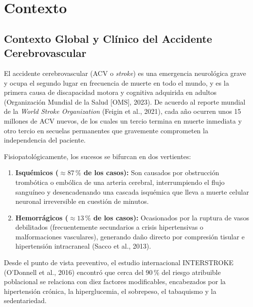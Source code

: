 \documentclass[12pt,a4paper]{article}
\begin{document}
\section{Contexto}

\subsection{Contexto Global y Clínico del Accidente Cerebrovascular}
El accidente cerebrovascular (ACV o \textit{stroke}) es una emergencia neurológica grave y ocupa el segundo lugar en frecuencia de muerte en todo el mundo, y es la primera causa de discapacidad motora y cognitiva adquirida en adultos (Organización Mundial de la Salud [OMS], 2023). De acuerdo al reporte mundial de la \textit{World Stroke Organization} (Feigin et al., 2021), cada año ocurren unos 15 millones de ACV nuevos, de los cuales un tercio termina en muerte inmediata y otro tercio en secuelas permanentes que gravemente comprometen la independencia del paciente.

Fisiopatológicamente, los sucesos se bifurcan en dos vertientes:
\begin{enumerate}[leftmargin=1.2cm, itemsep=0.2em]
    \item \textbf{Isquémicos ($\approx 87\,\%$ de los casos):} Son causados por obstrucción trombótica o embólica de una arteria cerebral, interrumpiendo el flujo sanguíneo y desencadenando una cascada isquémica que lleva a muerte celular neuronal irreversible en cuestión de minutos.
    \item \textbf{Hemorrágicos ($\approx 13\,\%$ de los casos):} Ocasionados por la ruptura de vasos debilitados (frecuentemente secundarios a crisis hipertensivas o malformaciones vasculares), generando daño directo por compresión tisular e hipertensión intracraneal (Sacco et al., 2013).
\end{enumerate}

Desde el punto de vista preventivo, el estudio internacional INTERSTROKE (O'Donnell et al., 2016) encontró que cerca del $90\,\%$ del riesgo atribuible poblacional se relaciona con diez factores modificables, encabezados por la hipertensión crónica, la hiperglucemia, el sobrepeso, el tabaquismo y la sedentariedad.
\end{document}
